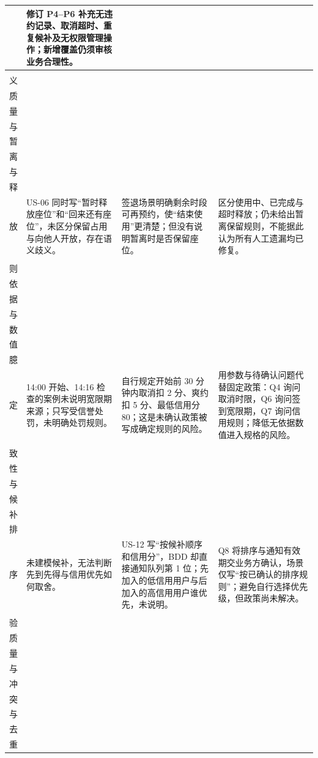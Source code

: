 \documentclass[11pt,a4paper]{article}
\begin{document}
\begin{longtable}{@{}p{}p{}p{}p{}@{}}
    &
    修订 P4--P6 补充无违约记录、取消超时、重复候补及无权限管理操作；新增覆盖仍须审核业务合理性。 \\
    \midrule
    \comparisonrowtitle{语\\义\\质\\量\\与\\暂\\离\\与\\释\\放} &
    US-06 同时写“暂时释放座位”和“回来还有座位”，未区分保留占用与向他人开放，存在语义歧义。
    &
    签退场景明确剩余时段可再预约，使“结束使用”更清楚；但没有说明暂离时是否保留座位。
    &
    区分使用中、已完成与超时释放；仍未给出暂离保留规则，不能据此认为所有人工遗漏均已修复。 \\
    \midrule
    \comparisonrowtitle{规\\则\\依\\据\\与\\数\\值\\臆\\定} &
    14:00 开始、14:16 检查的案例未说明宽限期来源；只写受信誉处罚，未明确处罚规则。
    &
    自行规定开始前 30 分钟内取消扣 2 分、爽约扣 5 分、最低信用分 80；这是未确认政策被写成确定规则的风险。
    &
    用参数与待确认问题代替固定政策：Q4 询问取消时限，Q6 询问签到宽限期，Q7 询问信用规则；降低无依据数值进入规格的风险。 \\
    \midrule
    \comparisonrowtitle{一\\致\\性\\与\\候\\补\\排\\序} &
    未建模候补，无法判断先到先得与信用优先如何取舍。
    &
    US-12 写“按候补顺序和信用分”，BDD 却直接通知队列第 1 位；先加入的低信用用户与后加入的高信用用户谁优先，未说明。
    &
    Q8 将排序与通知有效期交业务方确认，场景仅写“按已确认的排序规则”；避免自行选择优先级，但政策尚未解决。 \\
    \midrule
    \comparisonrowtitle{校\\验\\质\\量\\与\\冲\\突\\与\\去\\重} &

\end{longtable}
\end{document}
